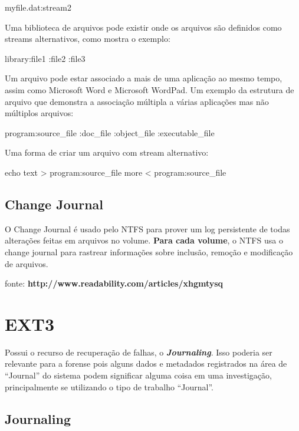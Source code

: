 {
\raggedright
myfile.dat:stream2
}

Uma biblioteca de arquivos pode existir onde os arquivos são definidos como streams alternativos, como mostra o exemplo:

{
\raggedright
library:file1
:file2
:file3
}

Um arquivo pode estar associado a mais de uma aplicação ao mesmo tempo, assim como  Microsoft Word e Microsoft WordPad. Um exemplo da estrutura de arquivo que demonstra a associação múltipla a várias aplicações mas não múltiplos arquivos:

{
\raggedright
program:source_file
:doc_file
:object_file
:executable_file
}

Uma forma de criar um arquivo com stream alternativo:

{
\raggedright
echo text > program:source_file
more < program:source_file
}

\cite{
Um detalhe muito importante é que essa funcionalidade está presente somente no NTFS e é incompatível para o FAT, ou seja, se um disco com sistema de arquivo FAT receber a cópia de um arquivo NTFS os streams e outros atributos não suportados pelo FAT serão perdidos sem nenhum aviso.}

\subsection{Change Journal}

O Change Journal é usado pelo NTFS para prover um log persistente de todas alterações feitas em arquivos no volume. \textbf{Para cada volume}, o NTFS usa o change journal para rastrear informações sobre inclusão, remoção e modificação de arquivos.

fonte: \textbf{http://www.readability.com/articles/xhgmtysq}

\section{EXT3}

Possui o recurso de recuperação de falhas, o \emph{\textbf{Journaling}}. Isso poderia ser relevante para a forense pois alguns dados e metadados registrados na área de ``Journal'' do sistema podem significar alguma coisa em uma investigação, principalmente se utilizando o tipo de trabalho ``Journal''.

\subsection{Journaling}

